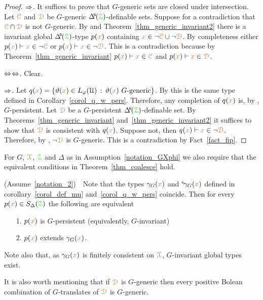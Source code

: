 \begin{proof}
  $\Rightarrow$.
  It suffices to prove that $G$-generic sets are closed under intersection.
  Let ${\color{brown}\EuScript C}$ and ${\color{brown}\EuScript D}$ be $G$-generic $\BDelta({\grZ})$-definable sets.
  Suppose for a contradiction that ${\color{brown}\EuScript C}\cap{\color{brown}\EuScript D}$ is not $G$-generic.
  By  and Theorem~\ref{thm_generic_invariant2} there is a invariant global $\BDelta({\grZ})$-type $p({\color{brown} x})$ containing ${\color{brown} x}\in\neg{\color{brown}\EuScript C}\cup\neg{\color{brown}\EuScript D}$.
  By completeness either $p({\color{brown} x})\vdash{\color{brown}x}\in\neg{\color{brown}\EuScript C}$ or $p({\color{brown} x})\vdash{\color{brown}x}\in\neg{\color{brown}\EuScript D}$.
  This is a contradiction because by Theorem~\ref{thm_generic_invariant} $p({\color{brown} x})\vdash{\color{brown}x}\in{\color{brown}\EuScript C}$ and $p({\color{brown} x})\vdash{\color{brown}x}\in{\color{brown}\EuScript D}$.

  $\Leftrightarrow$$\Leftrightarrow$. Clear.

  $\Rightarrow$.
  Let $q({\color{brown} x})=\{\vartheta({\color{brown} x})\in L_\varphi(\EuScript U)\,:\,\vartheta({\color{brown} x})\textrm{ $G$-generic}\}$.
  By  this is the same type defined in Corollary~\ref{corol_q_w_pers}.
  Therefore, any completion of $q({\color{brown} x})$ is, by , $G$-persistent.
  Let ${\color{brown}\EuScript D}$ be a $G$-persistent $\BDelta({\grZ})$-definable set.
  By Theorems~\ref{thm_generic_invariant} and~\ref{thm_generic_invariant2} it suffices to show that ${\color{brown}\EuScript D}$ is consistent with $q({\color{brown} x})$.
  Suppose not, then $q({\color{brown} x})\vdash {\color{brown}x}\in\neg{\color{brown}\EuScript D}$.
  Therefore, by , $\neg{\color{brown}\EuScript D}$ is $G$-generic.
  This is a contradiction by Fact~\ref{fact_fip}.
\end{proof}


\begin{assumption}\label{notation_2}
  For $G$, ${\color{brown}\EuScript X}$, ${\color{green}\EuScript Z}$ and $\Delta$ as in Assumption~\ref{notation_GXphi} we also require that the equivalent conditions in Theorem~\ref{thm_coalesce} hold.
\end{assumption}

\begin{remark}\label{rem_coalesce}
  (Assume~\ref{notation_2})\ \ 
  Note that the types $\gamma_G({\color{brown} x})$ and  ${}^{\rm s}\kern-.2ex\gamma_G({\color{brown} x})$ defined in corollary~\ref{corol_def_mu} and~\ref{corol_q_w_pers} coincide.
  Then for every $p({\color{brown} x})\in S_\Delta({\color{green}\EuScript Z})$ the following are equivalent
  \begin{itemize}
    \item[1.] $p({\color{brown} x})$ is $G$-persistent (equivalently, $G$-invariant)
    \item[2.] $p({\color{brown} x})$ extends $\gamma_G({\color{brown} x})$.
  \end{itemize}
  Note also that, as $\gamma_G({\color{brown} x})$ is finitely consistent on ${\color{brown}\EuScript X}$, $G$-invariant global types exist.

  It is also worth mentioning that if ${\color{brown}\EuScript D}$ is $G$-generic then every positive Bolean combination of $G$-translates of ${\color{brown}\EuScript D}$ is $G$-generic.
\end{remark}

